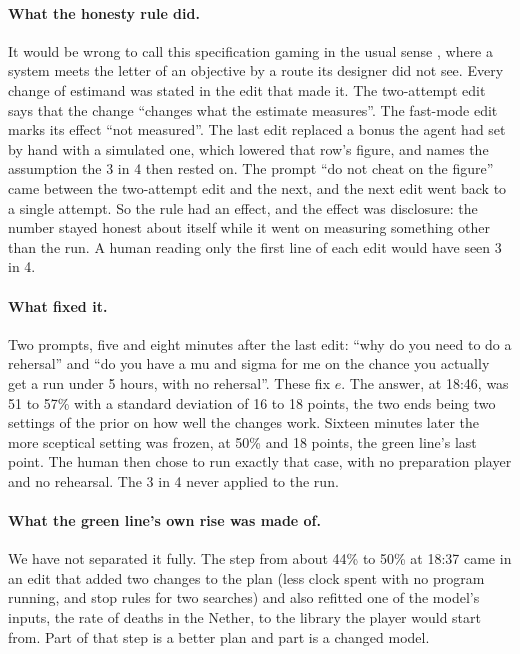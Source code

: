 \documentclass[11pt,a4paper]{article}
\begin{document}
\paragraph{What the honesty rule did.} It would be wrong to call this specification gaming in the usual sense \citep{krakovna2020}, where a system meets the letter of an objective by a route its designer did not see. Every change of estimand was stated in the edit that made it. The two-attempt edit says that the change ``changes what the estimate measures''. The fast-mode edit marks its effect ``not measured''. The last edit replaced a bonus the agent had set by hand with a simulated one, which lowered that row's figure, and names the assumption the 3 in 4 then rested on. The prompt ``do not cheat on the figure'' came between the two-attempt edit and the next, and the next edit went back to a single attempt. So the rule had an effect, and the effect was disclosure: the number stayed honest about itself while it went on measuring something other than the run. A human reading only the first line of each edit would have seen 3 in 4.

\paragraph{What fixed it.} Two prompts, five and eight minutes after the last edit: ``why do you need to do a rehersal'' and ``do you have a mu and sigma for me on the chance you actually get a run under 5 hours, with no rehersal''. These fix $e$. The answer, at 18:46, was 51 to 57\% with a standard deviation of 16 to 18 points, the two ends being two settings of the prior on how well the changes work. Sixteen minutes later the more sceptical setting was frozen, at 50\% and 18 points, the green line's last point. The human then chose to run exactly that case, with no preparation player and no rehearsal. The 3 in 4 never applied to the run.

\paragraph{What the green line's own rise was made of.} We have not separated it fully. The step from about 44\% to 50\% at 18:37 came in an edit that added two changes to the plan (less clock spent with no program running, and stop rules for two searches) and also refitted one of the model's inputs, the rate of deaths in the Nether, to the library the player would start from. Part of that step is a better plan and part is a changed model.
\end{document}
